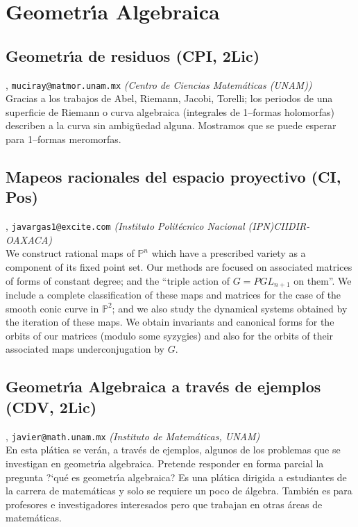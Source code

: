 \section{Geometr\'\i a Algebraica}

\subsection{\sffamily Geometr\'\i a de residuos {\footnotesize (CPI, 2Lic)}} \label{reg-1146} 
, {\tt muciray@matmor.unam.mx}  {\slshape (Centro de Ciencias Matem\'aticas (UNAM))}\\
          \noindent  Gracias a los trabajos de Abel, Riemann, Jacobi, Torelli; los periodos de una superficie de Riemann o curva algebraica (integrales de 1--formas holomorfas)  describen a la curva sin ambig$\ddot{\hbox{u}}$edad alguna. Mostramos que se puede esperar para 1--formas meromorfas.
\subsection{\sffamily Mapeos racionales del espacio proyectivo {\footnotesize (CI, Pos)}} \label{reg-628} 
, {\tt javargas1@excite.com}  {\slshape (Instituto Polit\'ecnico Nacional (IPN)CIIDIR-OAXACA)}\\
          \noindent We construct rational maps of $ \mathbb{P}^n $ which have a prescribed variety as a component of its fixed point set. Our methods are focused on associated matrices of forms of constant degree; and the ``triple action of $ G = PGL_{n + 1} $ on them''. We include a complete classification of these maps and matrices for the case of the smooth conic curve in $ \mathbb{P}^2 $; and we also study the dynamical systems obtained by the iteration of these maps. We obtain invariants and canonical forms for the orbits of our matrices (modulo some syzygies) and also for the orbits of their associated maps underconjugation by $G$.
\subsection{\sffamily Geometr\'\i a Algebraica a trav\'es de ejemplos {\footnotesize (CDV, 2Lic)}} \label{reg-1022} 
, {\tt javier@math.unam.mx}  {\slshape (Instituto de Matem\'aticas, UNAM)}\\
          \noindent En esta pl\'atica se ver\'an, a trav\'es de ejemplos, algunos de los problemas que se investigan en geometr\'\i a algebraica. Pretende responder en forma parcial la pregunta ?`qu\'e es geometr\'\i a algebraica? Es una pl\'atica dirigida a estudiantes de la carrera de matem\'aticas y solo se requiere un poco de \'algebra. Tambi\'en es para profesores e investigadores interesados pero que trabajan en otras  \'areas de matem\'aticas.
